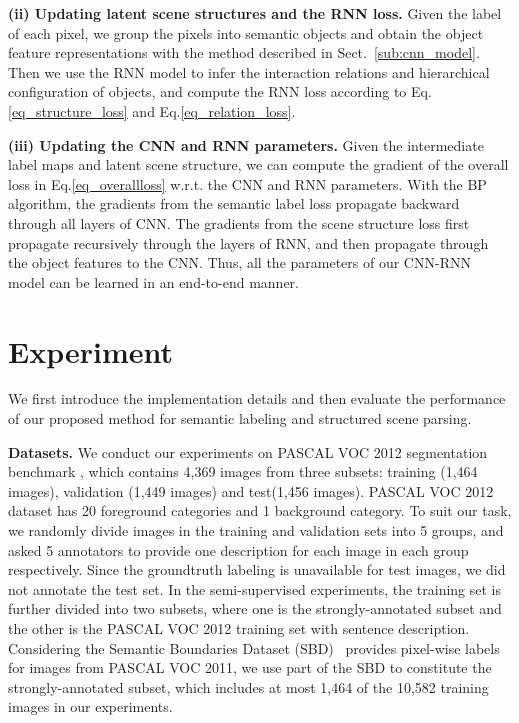 \documentclass[10pt,twocolumn,letterpaper]{article}
\begin{document}
\textbf{(ii) Updating latent scene structures and the RNN loss.} Given the label of each pixel, we group the pixels into semantic objects and obtain the object feature representations with the method described in Sect.~\ref{sub:cnn_model}. Then we use the RNN model to infer the interaction relations and hierarchical configuration of objects, and compute the RNN loss according to Eq.\eqref{eq_structure_loss} and Eq.\eqref{eq_relation_loss}.

\textbf{(iii) Updating the CNN and RNN parameters.}  Given the intermediate label maps and latent scene structure, we can compute the gradient of the overall loss in Eq.\eqref{eq_overallloss} w.r.t. the CNN and RNN parameters. With the BP algorithm, the gradients from the semantic label loss propagate backward through all layers of CNN. The gradients from the scene structure loss first propagate recursively through the layers of RNN, and then propagate through the object features to the CNN. Thus, all the parameters of our CNN-RNN model can be learned in an end-to-end manner.



\section{Experiment}
\label{sec:experiments}
We first introduce the implementation details and then evaluate the performance of our proposed method for semantic labeling and structured scene parsing.


\textbf{Datasets.}
We conduct our experiments on PASCAL VOC 2012 segmentation benchmark \cite{pascal_voc}, which contains 4,369 images from three subsets: training (1,464 images), validation (1,449 images) and test(1,456 images). PASCAL VOC 2012 dataset has 20 foreground categories and 1 background category. To suit our task, we randomly divide images in the training and validation sets into 5 groups, and asked 5 annotators to provide one description for each image in each group respectively. Since the groundtruth labeling is unavailable for test images, we did not annotate the test set. In the semi-supervised experiments, the training set is further divided into two subsets, where one is the strongly-annotated subset and the other is the PASCAL VOC 2012 training set with sentence description. Considering the Semantic Boundaries Dataset (SBD)~\cite{sbd_dataset} provides pixel-wise labels for images from PASCAL VOC 2011, we use part of the SBD to constitute the strongly-annotated subset, which includes at most 1,464 of the 10,582 training images in our experiments.
\end{document}

